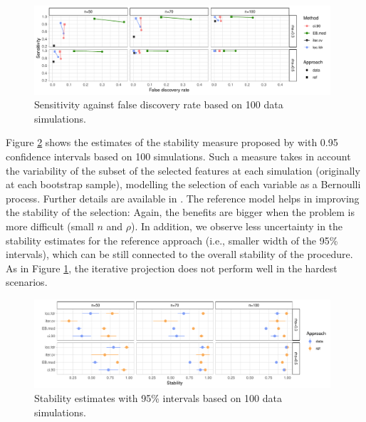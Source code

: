 \documentclass[american,]{article}
\theoremstyle{definition}
\begin{document}
\begin{figure}[tp]
  \centering
  \includegraphics[width=0.98\textwidth]{graphics/sensitivity_vs_fdr_iterated.pdf}
  \caption{Sensitivity against false discovery rate based on 100 data simulations.\\}
  \label{fig:sensitivity_vs_fdr_iterated}
\end{figure}


Figure \ref{fig:stability_iterated} shows the estimates of the stability
measure proposed by \cite{paper:stability} with 0.95 confidence
intervals based on 100 simulations. Such a measure takes in account
the variability of the subset of the selected features at each
simulation (originally at each bootstrap sample), modelling the
selection of each variable as a Bernoulli process. Further details are
available in \cite{paper:stability}. The reference model helps in
improving the stability of the selection: Again, the benefits are
bigger when the problem is more difficult (small $n$ and $\rho$). In
addition, we observe less uncertainty in the stability estimates for
the reference approach (i.e., smaller width of the 95\% intervals),
which can be still connected to the overall stability of the
procedure. As in Figure \ref{fig:sensitivity_vs_fdr_iterated}, the iterative
projection does not perform well in the hardest scenarios. 

\begin{figure}[tp]
  \centering
  \includegraphics[width=0.98\textwidth]{graphics/stability_iterated.pdf}
  \caption{Stability estimates with 95\% intervals based on 100 data simulations.\\}
  \label{fig:stability_iterated}
\end{figure}
\end{document}
